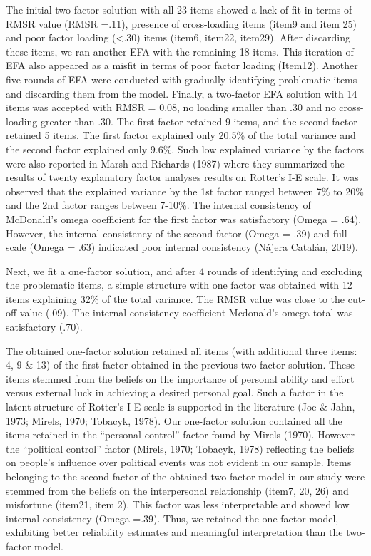 \documentclass[
  english,
  man]{apa6}
\begin{document}
The initial two-factor solution with all 23 items showed a lack of fit in terms of RMSR value (RMSR =.11), presence of cross-loading items (item9 and item 25) and poor factor loading (\textless.30) items (item6, item22, item29). After discarding these items, we ran another EFA with the remaining 18 items. This iteration of EFA also appeared as a misfit in terms of poor factor loading (Item12). Another five rounds of EFA were conducted with gradually identifying problematic items and discarding them from the model. Finally, a two-factor EFA solution with 14 items was accepted with RMSR = 0.08, no loading smaller than .30 and no cross-loading greater than .30. The first factor retained 9 items, and the second factor retained 5 items. The first factor explained only 20.5\% of the total variance and the second factor explained only 9.6\%. Such low explained variance by the factors were also reported in Marsh and Richards (1987) where they summarized the results of twenty explanatory factor analyses results on Rotter's I-E scale. It was observed that the explained variance by the 1st factor ranged between 7\% to 20\% and the 2nd factor ranges between 7-10\%. The internal consistency of McDonald's omega coefficient for the first factor was satisfactory (Omega = .64). However, the internal consistency of the second factor (Omega = .39) and full scale (Omega = .63) indicated poor internal consistency (Nájera Catalán, 2019).

Next, we fit a one-factor solution, and after 4 rounds of identifying and excluding the problematic items, a simple structure with one factor was obtained with 12 items explaining 32\% of the total variance. The RMSR value was close to the cut-off value (.09). The internal consistency coefficient Mcdonald's omega total was satisfactory (.70).

The obtained one-factor solution retained all items (with additional three items: 4, 9 \& 13) of the first factor obtained in the previous two-factor solution. These items stemmed from the beliefs on the importance of personal ability and effort versus external luck in achieving a desired personal goal. Such a factor in the latent structure of Rotter's I-E scale is supported in the literature (Joe \& Jahn, 1973; Mirels, 1970; Tobacyk, 1978). Our one-factor solution contained all the items retained in the ``personal control'' factor found by Mirels (1970). However the ``political control'' factor (Mirels, 1970; Tobacyk, 1978) reflecting the beliefs on people's influence over political events was not evident in our sample. Items belonging to the second factor of the obtained two-factor model in our study were stemmed from the beliefs on the interpersonal relationship (item7, 20, 26) and misfortune (item21, item 2). This factor was less interpretable and showed low internal consistency (Omega =.39). Thus, we retained the one-factor model, exhibiting better reliability estimates and meaningful interpretation than the two-factor model.
\end{document}
